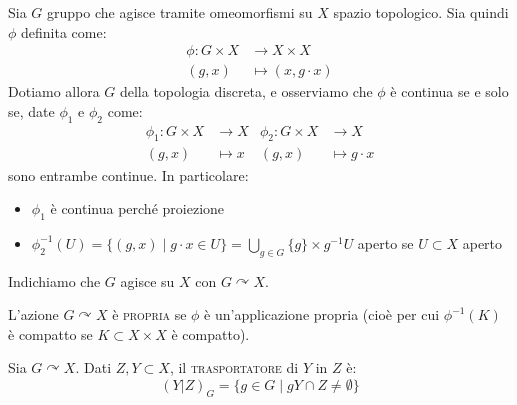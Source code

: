 Sia $G$ gruppo che agisce tramite omeomorfismi su $X$ spazio topologico. Sia quindi $\phi$ definita come:
\begin{align*}
\phi:G \times X &\longrightarrow X \times X\\
(g,x) &\longmapsto (x, g\cdot x)
\end{align*}
Dotiamo allora $G$ della topologia discreta, e osserviamo che $\phi$ è continua se e solo se, date $\phi _1$ e $\phi _2$ come:
\begin{align*}
\phi _1:G \times X & \longrightarrow X & \phi _2:G \times X &\longrightarrow X \\
(g,x) &\longmapsto x & (g,x) &\longmapsto g \cdot x
\end{align*}
sono entrambe continue. In particolare:
\begin{itemize}
\item $\phi _1$ è continua perché proiezione
\item $\phi _2 ^{-1}(U)=\{(g,x) \mid g \cdot x \in U\}=\displaystyle \bigcup _{g \in G} \{g\} \times g^{-1}U$ aperto se $U \subset X$ aperto
\end{itemize}

Indichiamo che $G$ agisce su $X$ con $G \curvearrowright X$.

\begin{defn}
L'azione $G \curvearrowright X$ è \textsc{propria} se $\phi$ è un'applicazione propria (cioè per cui $\phi ^{-1} (K)$ è compatto se $K \subset X \times X$ è compatto).
\end{defn}

\begin{defn}
Sia $G \curvearrowright X$. Dati $Z,Y \subset X$, il \textsc{trasportatore} di $Y$ in $Z$ è:
$$(Y|Z)_G=\{g \in G \mid gY \cap Z \neq \emptyset\}$$
\end{defn}

